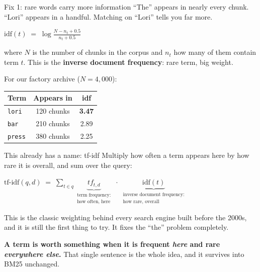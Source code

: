 \documentclass[aspectratio=169]{beamer}
\newcommand{\keybox}[1]{%
  \begin{tcolorbox}[colback=armblue!8, colframe=armblue, boxrule=0.6pt, arc=2pt]
  #1
  \end{tcolorbox}}
\begin{document}
\begin{frame}{Fix 1: rare words carry more information}
  \vspace{0.7em}
  ``The'' appears in nearly every chunk. ``Lori'' appears in a handful. Matching on
  ``Lori'' tells you far more.

  \vspace{0.9em}
  \begin{center}
    $\displaystyle \text{idf}(t) \;=\; \log\frac{N - n_t + 0.5}{n_t + 0.5}$
  \end{center}

  \vspace{0.6em}
  {\small where $N$ is the number of chunks in the corpus and $n_t$ how many of them
  contain term $t$. This is the \textbf{inverse document frequency}: rare term, big weight.}

  \vspace{0.9em}
  For our factory archive ($N = 4{,}000$):

  \vspace{0.4em}
  \begin{center}
  \small
  \begin{tabular}{lcc}
    \toprule
    \textbf{Term} & \textbf{Appears in} & \textbf{idf} \\
    \midrule
    \texttt{lori}  & 120 chunks & \textbf{3.47} \\
    \texttt{bar}   & 210 chunks & 2.89 \\
    \texttt{press} & 380 chunks & 2.25 \\
    \bottomrule
  \end{tabular}
  \end{center}
\end{frame}

\begin{frame}{This already has a name: tf-idf}
  \vspace{0.6em}
  Multiply how often a term appears here by how rare it is overall, and sum over the query:

  \vspace{0.7em}
  \begin{center}
    $\displaystyle \text{tf-idf}(q, d) \;=\; \sum_{t \in q}
    \underbrace{tf_{t,d}}_{\substack{\text{term frequency:}\\ \text{how often, here}}}
    \;\cdot\;
    \underbrace{\text{idf}(t)}_{\substack{\text{inverse document frequency:}\\ \text{how rare, overall}}}$
  \end{center}

  \vspace{0.9em}
  This is the classic weighting behind every search engine built before the 2000s, and it is
  still the first thing to try. It fixes the ``the'' problem completely.

  \vspace{0.9em}
  \keybox{\textbf{A term is worth something when it is frequent \emph{here} and rare
  \emph{everywhere else}.} That single sentence is the whole idea, and it survives into
  BM25 unchanged.}
\end{frame}
\end{document}
